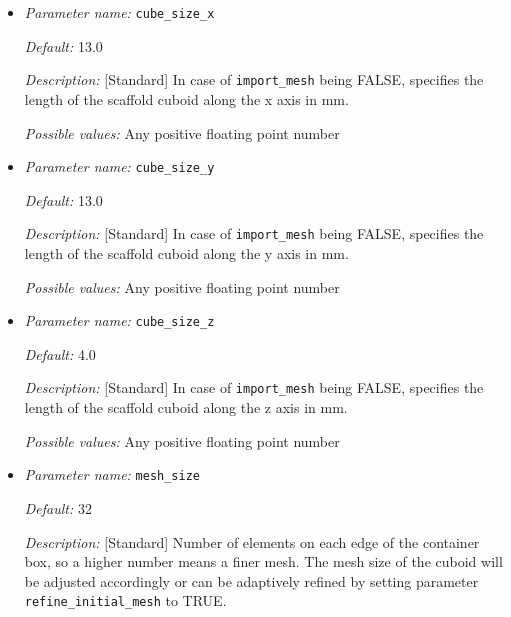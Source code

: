 \begin{itemize}
{\it Description:} [Standard] In case of {\tt import\_mesh} being FALSE, specifies the length of the container box (for the electrolyte) in mm.

{\it Possible values:} Any positive floating point number 


\item {\it Parameter name:} {\tt cube\_size\_x}
\label{parameters:cube_size_x}


{\it Default:} 13.0

{\it Description:} [Standard] In case of {\tt import\_mesh} being FALSE, specifies the length of the scaffold cuboid along the x axis in mm.

{\it Possible values:} Any positive floating point number 


\item {\it Parameter name:} {\tt cube\_size\_y}
\label{parameters:cube_size_y}


{\it Default:} 13.0

{\it Description:} [Standard] In case of {\tt import\_mesh} being FALSE, specifies the length of the scaffold cuboid along the y axis in mm.

{\it Possible values:} Any positive floating point number 


\item {\it Parameter name:} {\tt cube\_size\_z}
\label{parameters:cube_size_z}


{\it Default:} 4.0

{\it Description:} [Standard] In case of {\tt import\_mesh} being FALSE, specifies the length of the scaffold cuboid along the z axis in mm.


{\it Possible values:} Any positive floating point number 


\item {\it Parameter name:} {\tt mesh\_size}
\label{parameters:mesh_size}


{\it Default:} 32

{\it Description:} [Standard] Number of elements on each edge of the container box, so a higher number means a finer mesh. The mesh size of the cuboid will be adjusted accordingly or can be adaptively refined by setting parameter {\tt refine\_initial\_mesh} to TRUE.


\end{itemize}
